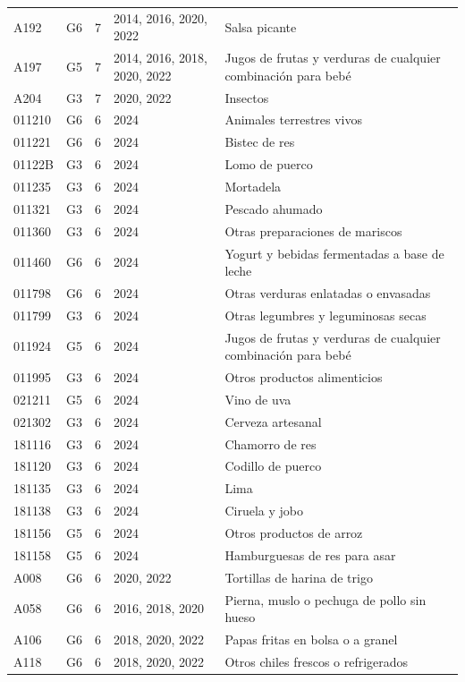 \begin{table}[ht]
\begin{tabular}{llrll}
  A192 & G6 &   7 & 2014, 2016, 2020, 2022 & Salsa picante \\ 
  A197 & G5 &   7 & 2014, 2016, 2018, 2020, 2022 & Jugos de frutas y verduras de cualquier combinación para bebé \\ 
  A204 & G3 &   7 & 2020, 2022 & Insectos \\ 
  011210 & G6 &   6 & 2024 & Animales terrestres vivos \\ 
  011221 & G6 &   6 & 2024 & Bistec de res \\ 
  01122B & G3 &   6 & 2024 & Lomo de puerco \\ 
  011235 & G3 &   6 & 2024 & Mortadela \\ 
  011321 & G3 &   6 & 2024 & Pescado ahumado \\ 
  011360 & G3 &   6 & 2024 & Otras preparaciones de mariscos \\ 
  011460 & G6 &   6 & 2024 & Yogurt y bebidas fermentadas a base de leche \\ 
  011798 & G6 &   6 & 2024 & Otras verduras enlatadas o envasadas \\ 
  011799 & G3 &   6 & 2024 & Otras legumbres y leguminosas secas \\ 
  011924 & G5 &   6 & 2024 & Jugos de frutas y verduras de cualquier combinación para bebé \\ 
  011995 & G3 &   6 & 2024 & Otros productos alimenticios \\ 
  021211 & G5 &   6 & 2024 & Vino de uva \\ 
  021302 & G3 &   6 & 2024 & Cerveza artesanal \\ 
  181116 & G3 &   6 & 2024 & Chamorro de res \\ 
  181120 & G3 &   6 & 2024 & Codillo de puerco \\ 
  181135 & G3 &   6 & 2024 & Lima \\ 
  181138 & G3 &   6 & 2024 & Ciruela y jobo \\ 
  181156 & G5 &   6 & 2024 & Otros productos de arroz \\ 
  181158 & G5 &   6 & 2024 & Hamburguesas de res para asar \\ 
  A008 & G6 &   6 & 2020, 2022 & Tortillas de harina de trigo \\ 
  A058 & G6 &   6 & 2016, 2018, 2020 & Pierna, muslo o pechuga de pollo sin hueso \\ 
  A106 & G6 &   6 & 2018, 2020, 2022 & Papas fritas en bolsa o a granel \\ 
  A118 & G6 &   6 & 2018, 2020, 2022 & Otros chiles frescos o refrigerados \\ 

\end{tabular}
\end{table}
